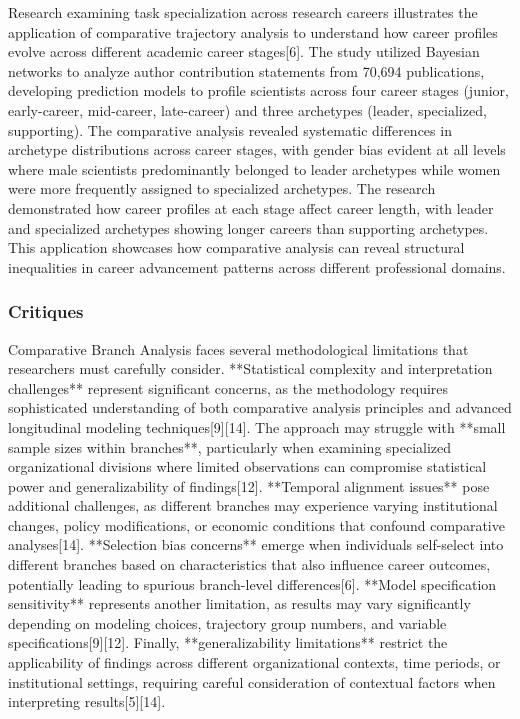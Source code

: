 \documentclass[main.tex]{subfiles}
\begin{document}
Research examining task specialization across research careers illustrates the application of comparative trajectory analysis to understand how career profiles evolve across different academic career stages[6]. The study utilized Bayesian networks to analyze author contribution statements from 70,694 publications, developing prediction models to profile scientists across four career stages (junior, early-career, mid-career, late-career) and three archetypes (leader, specialized, supporting). The comparative analysis revealed systematic differences in archetype distributions across career stages, with gender bias evident at all levels where male scientists predominantly belonged to leader archetypes while women were more frequently assigned to specialized archetypes. The research demonstrated how career profiles at each stage affect career length, with leader and specialized archetypes showing longer careers than supporting archetypes. This application showcases how comparative analysis can reveal structural inequalities in career advancement patterns across different professional domains.

\subsubsection{Critiques}

Comparative Branch Analysis faces several methodological limitations that researchers must carefully consider. **Statistical complexity and interpretation challenges** represent significant concerns, as the methodology requires sophisticated understanding of both comparative analysis principles and advanced longitudinal modeling techniques[9][14]. The approach may struggle with **small sample sizes within branches**, particularly when examining specialized organizational divisions where limited observations can compromise statistical power and generalizability of findings[12]. **Temporal alignment issues** pose additional challenges, as different branches may experience varying institutional changes, policy modifications, or economic conditions that confound comparative analyses[14]. **Selection bias concerns** emerge when individuals self-select into different branches based on characteristics that also influence career outcomes, potentially leading to spurious branch-level differences[6]. **Model specification sensitivity** represents another limitation, as results may vary significantly depending on modeling choices, trajectory group numbers, and variable specifications[9][12]. Finally, **generalizability limitations** restrict the applicability of findings across different organizational contexts, time periods, or institutional settings, requiring careful consideration of contextual factors when interpreting results[5][14].
\end{document}
